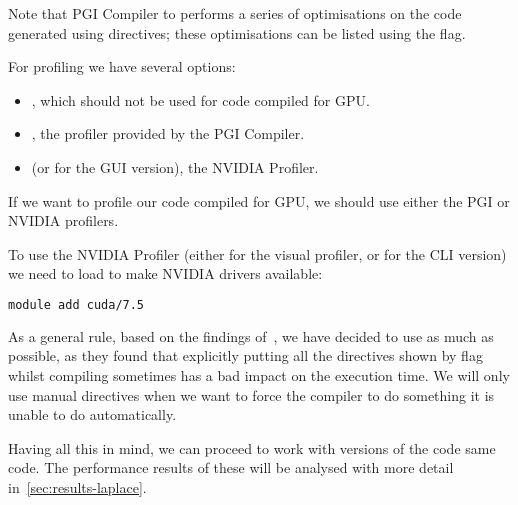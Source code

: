 Note that PGI Compiler to performs a series of optimisations on the code generated using  directives; these optimisations can be listed using the  flag.

For profiling we have several options:
\begin{itemize}
	\item {}, which should not be used for code compiled for GPU.
	\item {}, the profiler provided by the PGI Compiler.
	\item {} (or  for the GUI version), the NVIDIA Profiler.
\end{itemize}

If we want to profile our code compiled for GPU, we should use either the PGI or NVIDIA profilers.

To use the NVIDIA Profiler (either  for the visual profiler, or  for the CLI version) we need to load  to make NVIDIA drivers available:
\begin{lstlisting}[language=bash]
module add cuda/7.5
\end{lstlisting}

\bigskip
As a general rule, based on the findings of~\cite{a:openacc-best-practices}, we have decided to use  as much as possible, as they found that explicitly putting all the directives shown by  flag whilst compiling sometimes has a bad impact on the execution time. We will only use manual directives when we want to force the compiler to do something it is unable to do automatically.

Having all this in mind, we can proceed to work with versions of the code same  code. The performance results of these will be analysed with more detail in~\cref{sec:results-laplace}.
